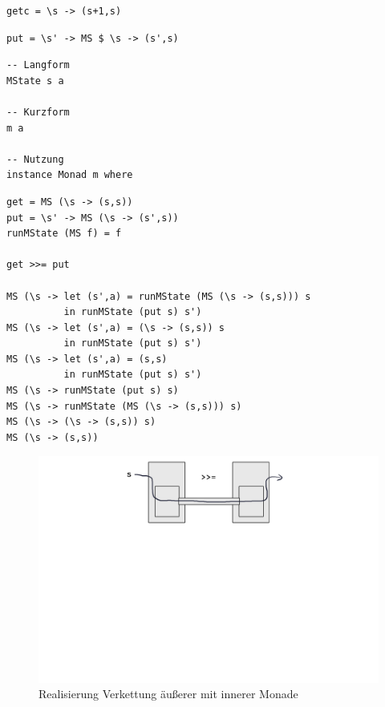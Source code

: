		\begin{lstlisting}
getc = \s -> (s+1,s)
		\end{lstlisting}

		\begin{lstlisting}
put = \s' -> MS $ \s -> (s',s)
		\end{lstlisting}

		\begin{lstlisting}
-- Langform
MState s a

-- Kurzform
m a

-- Nutzung
instance Monad m where
		\end{lstlisting}

		\lstHaskell[detaillierte Aufschlüsselung anhand von \texttt{get >>= put}]
		\begin{lstlisting}
get = MS (\s -> (s,s))
put = \s' -> MS (\s -> (s',s))
runMState (MS f) = f

get >>= put

MS (\s -> let (s',a) = runMState (MS (\s -> (s,s))) s
          in runMState (put s) s')
MS (\s -> let (s',a) = (\s -> (s,s)) s
          in runMState (put s) s')
MS (\s -> let (s',a) = (s,s)
          in runMState (put s) s')
MS (\s -> runMState (put s) s)
MS (\s -> runMState (MS (\s -> (s,s))) s)
MS (\s -> (\s -> (s,s)) s)
MS (\s -> (s,s))
		\end{lstlisting}
		
		\begin{figure}[ht]
			\caption{Realisierung Verkettung äußerer mit innerer Monade}
			\includegraphics[width=\textwidth]{workfiles/v8_1}
		\end{figure}

